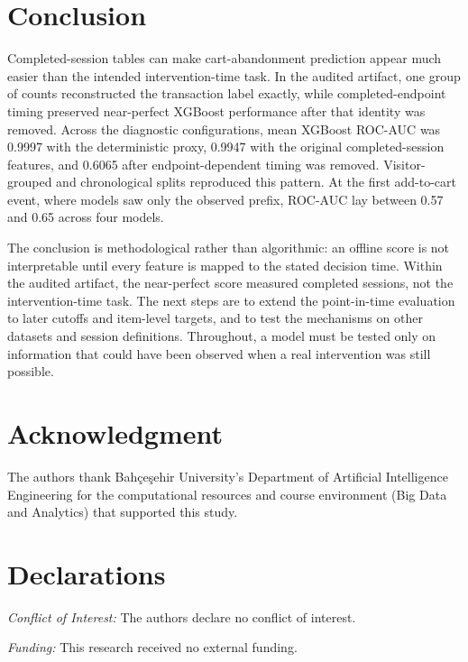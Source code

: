 \documentclass[conference, letterpaper]{IEEEtran}
\begin{document}
\section{Conclusion}
Completed-session tables can make cart-abandonment prediction appear much easier than the intended intervention-time task. In the audited artifact, one group of counts reconstructed the transaction label exactly, while completed-endpoint timing preserved near-perfect XGBoost performance after that identity was removed. Across the diagnostic configurations, mean XGBoost ROC-AUC was 0.9997 with the deterministic proxy, 0.9947 with the original completed-session features, and 0.6065 after endpoint-dependent timing was removed. Visitor-grouped and chronological splits reproduced this pattern. At the first add-to-cart event, where models saw only the observed prefix, ROC-AUC lay between 0.57 and 0.65 across four models.

The conclusion is methodological rather than algorithmic: an offline score is not interpretable until every feature is mapped to the stated decision time. Within the audited artifact, the near-perfect score measured completed sessions, not the intervention-time task. The next steps are to extend the point-in-time evaluation to later cutoffs and item-level targets, and to test the mechanisms on other datasets and session definitions. Throughout, a model must be tested only on information that could have been observed when a real intervention was still possible.

\section*{Acknowledgment}
The authors thank Bah\c{c}e\c{s}ehir University's Department of Artificial Intelligence Engineering for the computational resources and course environment (Big Data and Analytics) that supported this study.

\section*{Declarations}
\textit{Conflict of Interest:} The authors declare no conflict of interest.

\textit{Funding:} This research received no external funding.
\end{document}
